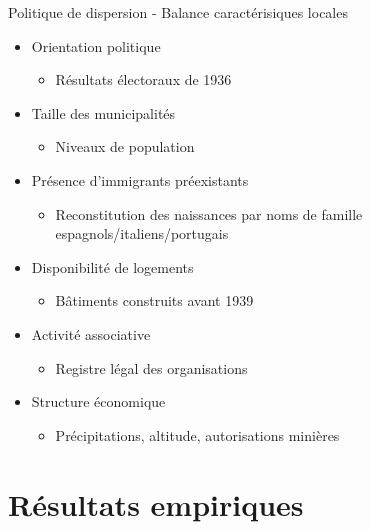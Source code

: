 \documentclass[xcolor=dvipsnames, aspectratio=169]{beamer}
\begin{document}
\begin{frame}[label=dispersion]{Politique de dispersion - Balance caractérisiques locales}

\begin{itemize}
  \item Orientation politique
    \begin{itemize}
      \item Résultats électoraux de 1936 \citep{piketty_histoire_2023}
    \end{itemize}
  \item Taille des municipalités
    \begin{itemize}
      \item Niveaux de population \citep{insee_pop_hist_comm}
    \end{itemize}
  \item Présence d'immigrants préexistants
    \begin{itemize}
      \item Reconstitution des naissances par noms de famille espagnols/italiens/portugais \citep{insee_deces_2025}
    \end{itemize}
  \item Disponibilité de logements
    \begin{itemize}
      \item Bâtiments construits avant 1939 \citep{insee1968logements}
    \end{itemize}
  \item Activité associative
    \begin{itemize}
      \item Registre légal des organisations \citep{dila_journalofficiel_portal}
    \end{itemize}
  \item Structure économique
    \begin{itemize}
      \item Précipitations, altitude, autorisations minières \citep{pauling2006,camino2021}
    \end{itemize}
\end{itemize}

\hyperlink{Balance}{} 

\end{frame}



\section{Résultats empiriques}
\end{document}
